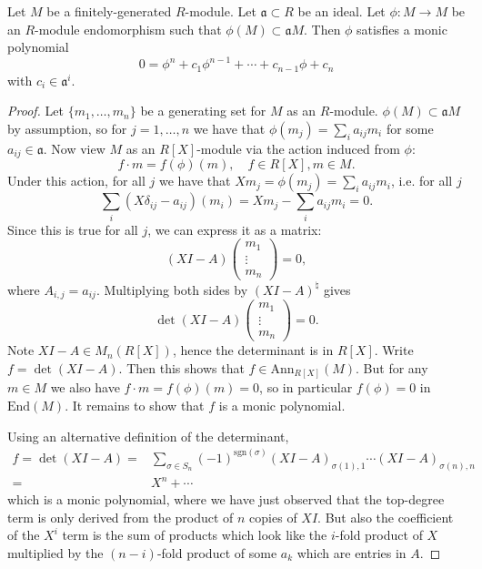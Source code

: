 \documentclass[12pt]{article}
\begin{document}
\begin{lemma}
	Let $M$ be a finitely-generated $R$-module. Let $\mathfrak{a}\subset R$ be an ideal. Let $\phi:M\to M$ be an $R$-module endomorphism such that $\phi(M)\subset\mathfrak{a}M$. Then $\phi$ satisfies a monic polynomial 
	\begin{equation*}
		0 = \phi^n + c_1\phi^{n-1} + \cdots + c_{n-1}\phi + c_n
	\end{equation*}
	with $c_i\in\mathfrak{a}^i$.
\end{lemma}
\begin{proof}
	Let $\{m_1,\dots, m_n\}$ be a generating set for $M$ as an $R$-module. $\phi(M)\subset\mathfrak{a}M$ by assumption, so for $j=1,\dots,n$ we have that $\phi(m_j) = \sum_i a_{ij}m_i$ for some $a_{ij}\in\mathfrak{a}$. Now view $M$ as an $R[X]$-module via the action induced from $\phi$:
	\begin{equation*}
		f\cdot m = f(\phi)(m), \quad f\in R[X], m\in M.
	\end{equation*}
	Under this action, for all $j$ we have that $Xm_j = \phi(m_j) = \sum_i a_{ij}m_i$, i.e. for all $j$ 
	\begin{equation*}
		\sum_i(X\delta_{ij} - a_{ij})(m_i) = Xm_j - \sum_i a_{ij}m_i = 0.
	\end{equation*}
	Since this is true for all $j$, we can express it as a matrix:
	\begin{equation*}
		(XI-A) \begin{pmatrix} m_1 \\ \vdots \\ m_n \end{pmatrix} = 0,
	\end{equation*}
	where $A_{i,j}=a_{ij}$. Multiplying both sides by $(XI-A)^\natural$ gives 
	\begin{equation*}
		\det(XI-A)\begin{pmatrix} m_1 \\ \vdots \\ m_n \end{pmatrix} = 0.
	\end{equation*}
	Note $XI-A\in M_n(R[X])$, hence the determinant is in $R[X]$. Write $f=\det(XI-A)$. Then this shows that $f\in\text{Ann}_{R[X]}(M)$. But for any $m\in M$ we also have $f\cdot m = f(\phi)(m) = 0$, so in particular $f(\phi)=0$ in $\text{End}(M)$. It remains to show that $f$ is a monic polynomial.

	Using an alternative definition of the determinant, 
	\begin{align*}
		f = \det(XI-A) =& \sum_{\sigma\in S_n}(-1)^{\text{sgn}(\sigma)}(XI-A)_{\sigma(1),1}\cdots (XI-A)_{\sigma(n),n} \\
		=& X^n + \cdots
	\end{align*}
	which is a monic polynomial, where we have just observed that the top-degree term is only derived from the product of $n$ copies of $XI$. But also the coefficient of the $X^i$ term is the sum of products which look like the $i$-fold product of $X$ multiplied by the $(n-i)$-fold product of some $a_k$ which are entries in $A$.
\end{proof}


\end{document}
